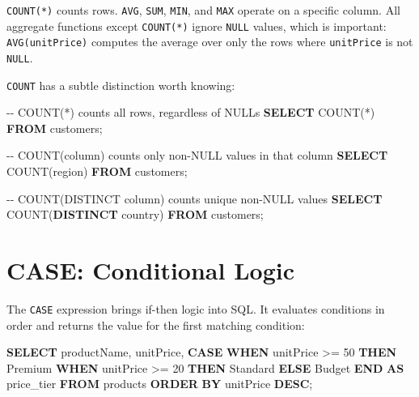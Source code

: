 \documentclass[
  letterpaper,
  DIV=11,
  numbers=noendperiod]{scrreprt}
\newenvironment{Shaded}{\begin{snugshade}}{\end{snugshade}}
\newcommand{\CommentTok}[1]{\textcolor[rgb]{0.37,0.37,0.37}{#1}}
\newcommand{\ControlFlowTok}[1]{\textcolor[rgb]{0.00,0.23,0.31}{\textbf{#1}}}
\newcommand{\DecValTok}[1]{\textcolor[rgb]{0.68,0.00,0.00}{#1}}
\newcommand{\FunctionTok}[1]{\textcolor[rgb]{0.28,0.35,0.67}{#1}}
\newcommand{\KeywordTok}[1]{\textcolor[rgb]{0.00,0.23,0.31}{\textbf{#1}}}
\newcommand{\NormalTok}[1]{\textcolor[rgb]{0.00,0.23,0.31}{#1}}
\newcommand{\OperatorTok}[1]{\textcolor[rgb]{0.37,0.37,0.37}{#1}}
\newcommand{\StringTok}[1]{\textcolor[rgb]{0.13,0.47,0.30}{#1}}
\begin{document}
\texttt{COUNT(*)} counts rows. \texttt{AVG}, \texttt{SUM}, \texttt{MIN},
and \texttt{MAX} operate on a specific column. All aggregate functions
except \texttt{COUNT(*)} ignore \texttt{NULL} values, which is
important: \texttt{AVG(unitPrice)} computes the average over only the
rows where \texttt{unitPrice} is not \texttt{NULL}.

\texttt{COUNT} has a subtle distinction worth knowing:

\begin{codelisting}

\caption{\texttt{duckdb}}

\begin{Shaded}
\begin{Highlighting}[]
\CommentTok{{-}{-} COUNT(*) counts all rows, regardless of NULLs}
\KeywordTok{SELECT} \FunctionTok{COUNT}\NormalTok{(}\OperatorTok{*}\NormalTok{) }\KeywordTok{FROM}\NormalTok{ customers;}

\CommentTok{{-}{-} COUNT(column) counts only non{-}NULL values in that column}
\KeywordTok{SELECT} \FunctionTok{COUNT}\NormalTok{(region) }\KeywordTok{FROM}\NormalTok{ customers;}

\CommentTok{{-}{-} COUNT(DISTINCT column) counts unique non{-}NULL values}
\KeywordTok{SELECT} \FunctionTok{COUNT}\NormalTok{(}\KeywordTok{DISTINCT}\NormalTok{ country) }\KeywordTok{FROM}\NormalTok{ customers;}
\end{Highlighting}
\end{Shaded}

\end{codelisting}

\section{CASE: Conditional Logic}\label{case-conditional-logic}

The \texttt{CASE} expression brings if-then logic into SQL. It evaluates
conditions in order and returns the value for the first matching
condition:

\begin{codelisting}

\caption{\texttt{duckdb}}

\begin{Shaded}
\begin{Highlighting}[]
\KeywordTok{SELECT}
\NormalTok{    productName,}
\NormalTok{    unitPrice,}
    \ControlFlowTok{CASE}
        \ControlFlowTok{WHEN}\NormalTok{ unitPrice }\OperatorTok{\textgreater{}=} \DecValTok{50} \ControlFlowTok{THEN} \StringTok{\textquotesingle{}Premium\textquotesingle{}}
        \ControlFlowTok{WHEN}\NormalTok{ unitPrice }\OperatorTok{\textgreater{}=} \DecValTok{20} \ControlFlowTok{THEN} \StringTok{\textquotesingle{}Standard\textquotesingle{}}
        \ControlFlowTok{ELSE} \StringTok{\textquotesingle{}Budget\textquotesingle{}}
    \ControlFlowTok{END} \KeywordTok{AS}\NormalTok{ price\_tier}
\KeywordTok{FROM}\NormalTok{ products}
\KeywordTok{ORDER} \KeywordTok{BY}\NormalTok{ unitPrice }\KeywordTok{DESC}\NormalTok{;}
\end{Highlighting}
\end{Shaded}

\end{codelisting}
\end{document}
